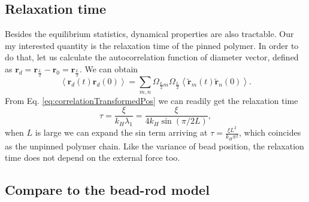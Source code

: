\subsection{Relaxation time}
\label{sub:relaxation_time}
Besides the equilibrium statistics, dynamical properties are also tractable.  Our my interested quantity is the relaxation time of the pinned polymer. In order to do that, let us calculate the autocorrelation function of diameter vector, defined as $\mathbf{r}_d = \mathbf{r}_{\frac{L}{2}} - \mathbf{r}_0 = \mathbf{r}_{\frac{L}{2}}$. We can obtain 
\begin{equation}
    \label{eq:diameterVectorCorrelation}
    \left<\mathbf{r}_d(t)\mathbf{r}_d(0)\right> = 
    \sum_{m,n}\Omega_{\frac{L}{2}m}\Omega_{\frac{L}{2}}
    \left<\tilde{\mathbf{r}}_m(t)\tilde{\mathbf{r}}_n(0)\right>.
\end{equation}
From Eq. \eqref{eq:correlationTransformedPos} we can readily get the relaxation time 
\begin{equation}
    \label{eq:relaxationTimeRouse}
    \tau = \frac{\xi}{k_H\lambda_1} = \frac{\xi}{4k_H\sin(\pi/2L)},
\end{equation}
when $L$ is large we can expand the sin term arriving at $\tau = \frac{\xi L^2}{k_H \pi^2}$, which coincides as the unpinned polymer chain. Like the variance of bead position, the relaxation time does not depend on the external force too. 

\subsection{Compare to the bead-rod model}
\label{sub:compare_to_the_bead_rod_model}

